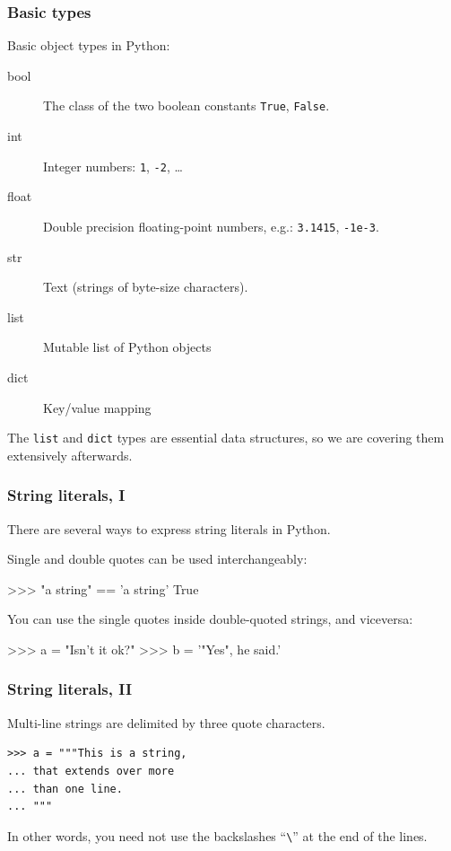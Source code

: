 \documentclass[english,serif,mathserif,xcolor=pdftex,dvipsnames,table]{beamer}
\begin{document}
\begin{frame}
  \frametitle{Basic types}
  Basic object types in Python:
  \begin{description}
  \item[bool] The class of the two boolean constants \texttt{True}, \texttt{False}.
  \item[int] Integer numbers: \texttt{1}, \texttt{-2}, \ldots
  \item[float] Double precision floating-point numbers, e.g.:
    \texttt{3.1415}, \texttt{-1e-3}.
  \item[str] Text (strings of byte-size characters).
  \item[list] Mutable list of Python objects
  \item[dict] Key/value mapping
  \end{description}

  \+
  The \texttt{list} and \texttt{dict} types are essential data
  structures, so we are covering them extensively afterwards.
\end{frame}

\begin{frame}[fragile]
  \frametitle{String literals, I}
  There are several ways to express string literals in Python.

  \+
  Single and double quotes can be used interchangeably:
\begin{semiverbatim}
>>> "a string" == 'a string'
True
\end{semiverbatim}

  \+
  You can use the single quotes inside double-quoted strings, and viceversa:
\begin{semiverbatim}
>>> a = "Isn't it ok?"
>>> b = '"Yes", he said.'
\end{semiverbatim}
\end{frame}


\begin{frame}[fragile]
  \frametitle{String literals, II}
  Multi-line strings are delimited by three quote characters.
\begin{lstlisting}
>>> a = """This is a string,
... that extends over more
... than one line.
... """
\end{lstlisting}

  \+ In other words, you need not use the backslashes
  ``\texttt{\textbackslash}'' at the end of the lines.
\end{frame}
\end{document}
